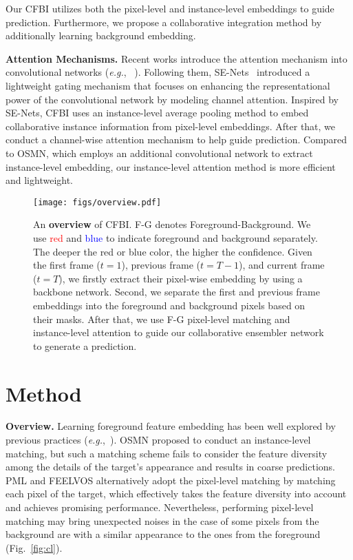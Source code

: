 \documentclass[runningheads]{llncs}
\def\eg{\emph{e.g.}}
\begin{document}
Our CFBI utilizes both the pixel-level and instance-level embeddings to guide prediction. Furthermore, we propose a collaborative integration method by additionally learning background embedding. 

\noindent\textbf{Attention Mechanisms.}
Recent works introduce the attention mechanism into convolutional networks (\eg, ~\cite{attention_conv1,attention_conv2}). 
Following them, SE-Nets~\cite{senet} introduced a lightweight gating mechanism that focuses on enhancing the representational power of the convolutional network by modeling channel attention. Inspired by SE-Nets, CFBI uses an instance-level average pooling method to embed collaborative instance information from pixel-level embeddings. After that, we conduct a channel-wise attention mechanism to help guide prediction. Compared to OSMN, which employs an additional convolutional network to extract instance-level embedding, our instance-level attention method is more efficient and lightweight.

\begin{figure}[t!]
    \centering
    \texttt{[image: figs/overview.pdf]}
    \caption{An \textbf{overview} of CFBI. F-G denotes Foreground-Background. We use \textcolor{red}{red} and \textcolor{blue}{blue} to indicate foreground and background separately. The deeper the red or blue color, the higher the confidence. Given the first frame ($t=1$), previous frame ($t=T-1$), and current frame ($t=T$), we firstly extract their pixel-wise embedding by using a backbone network. Second, we separate the first and previous frame embeddings into the foreground and background pixels based on their masks. After that, we use F-G pixel-level matching and instance-level attention to guide our collaborative ensembler network to generate a prediction.}
    \label{fig:overview}

\end{figure}


\section{Method}\label{sec:model}

\noindent\textbf{Overview.} Learning foreground feature embedding has been well explored by previous practices (\eg,~\cite{osmn,feelvos}). OSMN proposed to conduct an instance-level matching, but such a matching scheme fails to consider the feature diversity among the details of the target's appearance and results in coarse predictions. PML and FEELVOS alternatively adopt the pixel-level matching by matching each pixel of the target, which effectively takes the feature diversity into account and achieves promising performance. Nevertheless, performing pixel-level matching may bring unexpected noises in the case of some pixels from the background are with a similar appearance to the ones from the foreground (Fig.~\ref{fig:cl}).
\end{document}

